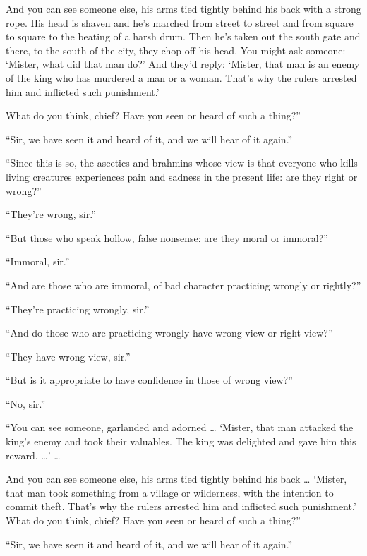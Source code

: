 \documentclass[12pt,openany]{book}%
\begin{document}
And you can see someone else, his arms tied tightly behind his back with a strong rope. His head is shaven and he’s marched from street to street and from square to square to the beating of a harsh drum. Then he’s taken out the south gate and there, to the south of the city, they chop off his head. You might ask someone: ‘Mister, what did that man do?’ And they’d reply: ‘Mister, that man is an enemy of the king who has murdered a man or a woman. That’s why the rulers arrested him and inflicted such punishment.’ 

What do you think, chief? Have you seen or heard of such a thing?” 

“Sir, we have seen it and heard of it, and we will hear of it again.” 

“Since this is so, the ascetics and brahmins whose view is that everyone who kills living creatures experiences pain and sadness in the present life: are they right or wrong?” 

“They’re wrong, sir.” 

“But those who speak hollow, false nonsense: are they moral or immoral?” 

“Immoral, sir.” 

“And are those who are immoral, of bad character practicing wrongly or rightly?” 

“They’re practicing wrongly, sir.” 

“And do those who are practicing wrongly have wrong view or right view?” 

“They have wrong view, sir.” 

“But is it appropriate to have confidence in those of wrong view?” 

“No, sir.” 

“You can see someone, garlanded and adorned … ‘Mister, that man attacked the king’s enemy and took their valuables. The king was delighted and gave him this reward. …’ … 

And you can see someone else, his arms tied tightly behind his back … ‘Mister, that man took something from a village or wilderness, with the intention to commit theft. That’s why the rulers arrested him and inflicted such punishment.’ What do you think, chief? Have you seen or heard of such a thing?” 

“Sir, we have seen it and heard of it, and we will hear of it again.” 
\end{document}
